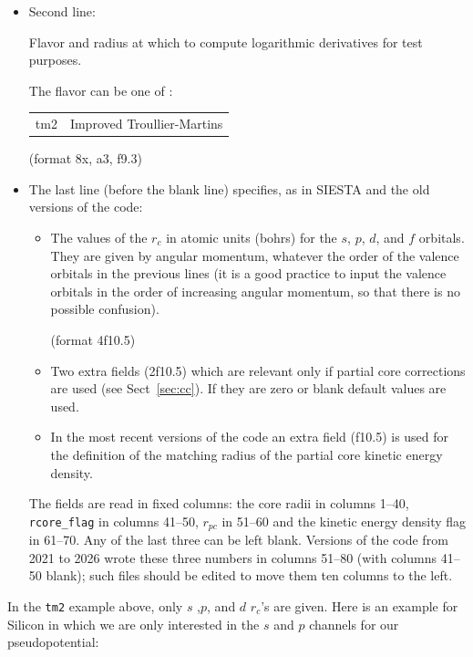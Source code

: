 \documentclass[11pt]{article}
\begin{document}
\begin{itemize}
\item Second line:

Flavor and radius at which to compute logarithmic
derivatives for test purposes.

The flavor can be one of :
\begin{tabular}{ll}
	tm2	&Improved Troullier-Martins\\
\end{tabular}

(format 8x, a3, f9.3)

\item The last line (before the blank line) specifies, as in \textsc{SIESTA}
and the old versions of the code:

\begin{itemize}
\item The values of the $r_c$ in atomic units (bohrs) for the $s$,
$p$, $d$, and $f$ orbitals.  They are given by angular momentum,
whatever the order of the valence orbitals in the previous lines
(it is a good practice to input the valence
orbitals in the order of increasing angular momentum,
so that there is no possible confusion).

(format 4f10.5)

\item Two extra fields (2f10.5) which are relevant only if partial
core corrections are used (see Sect~\ref{sec:cc}).  If they are zero
or blank default values are used.

\item In the most recent versions of the code an extra field (f10.5) is used
for the definition of the matching radius of the partial core kinetic energy density.

\end{itemize}

The fields are read in fixed columns: the core radii in columns 1--40,
{\tt rcore\_flag} in columns 41--50, $r_{pc}$ in 51--60 and the kinetic energy
density flag in 61--70.  Any of the last three can be left blank.
Versions of the code from 2021 to 2026 wrote these three numbers in columns 51--80
(with columns 41--50 blank); such files should be edited to move them ten columns
to the left.

\end{itemize}

In the {\tt tm2} example above, only $s$ ,$p$, and $d$ $r_c$'s are
given. Here is an example for Silicon in which we are only interested
in the $s$ and $p$ channels for our pseudopotential:
\end{document}
